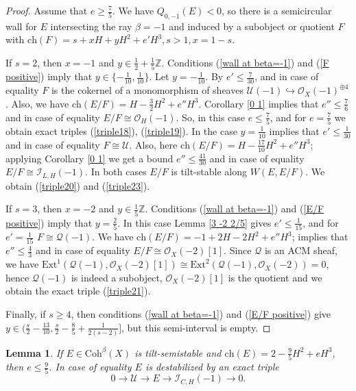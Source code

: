 \documentclass{amsart}
\newtheorem{lemma}[theorem]{Lemma}
\begin{document}
	\begin{proof} Assume that $e\ge\frac 75$. We have $Q_{0,-1}(E)<0$, so there is a semicircular wall for $E$ intersecting the ray $\beta=-1$ and induced by a subobject or quotient $F$ with $\mathrm{ch}(F)=s+xH+yH^2+e'H^3,s>1,x=1-s$.
		
	If $s=2$, then $x=-1$ and $y\in\frac 12+\frac 15\mathbb Z$. Conditions (\ref{wall at beta=-1}) and (\ref{F positive}) imply that $y\in\{-\frac{1}{10},\frac{1}{10}\}$. Let $y=-\frac{1}{10}$. By \cite[Lemma 3.8]{Vass} $e'\le\frac{7}{30}$, and in case of equality $F$ is the cokernel of a monomorphism of sheaves $\mathcal U(-1)\hookrightarrow\mathcal O_X(-1)^{\oplus 4}$. Also, we have $\mathrm{ch}(E/F)=H-\frac 32 H^2+e''H^3$. Corollary \ref{0 1} implies that $e''\le\frac 76$ and in case of equality $E/F\cong\mathcal O_H(-1)$. So, in this case $e\le\frac 75$, and for $e=\frac 75$ we obtain exact triples (\ref{triple18}), (\ref{triple19}). In the case $y=\frac{1}{10}$ \cite[Lemma 3.6]{Vass} implies that $e'\le\frac{1}{30}$ and in case of equality $F\cong \mathcal U$. Also, here $\mathrm{ch}(E/F)=H-\frac{17}{10} H^2+e''H^3$; applying Corollary \ref{0 1} we get a bound $e''\le\frac{41}{30}$ and in case of equality $E/F\cong\mathcal I_{L,H}(-1)$. In both cases $E/F$ is tilt-stable along $W(E,E/F)$. We obtain (\ref{triple20}) and (\ref{triple23}).
		
	If $s=3$, then $x=-2$ and $y\in\frac 15\mathbb Z$. Conditions (\ref{wall at beta=-1}) and (\ref{E/F positive}) imply that $y=\frac 25$. In this case Lemma \ref{3 -2 2/5} gives $e'\le\frac{1}{15}$, and for $e'=\frac{1}{15}$ $F\cong\mathcal Q(-1)$. We have $\mathrm{ch}(E/F)=-1+2H-2H^2+e''H^3$; \cite[Corollary 3.3]{Vass} implies that $e''\le\frac 43$ and in case of equality $E/F\cong\mathcal O_X(-2)[1]$. Since $\mathcal Q$ is an ACM sheaf, we have $\mathrm{Ext}^1(\mathcal Q(-1),\mathcal O_X(-2)[1])\cong\mathrm{Ext}^2(\mathcal Q(-1),\mathcal O_X(-2))=0$, hence $\mathcal Q(-1)$ is indeed a subobject, $\mathcal O_X(-2)[1]$ is the quotient and we obtain the exact triple (\ref{triple21}).
		
	Finally, if $s\ge 4$, then conditions (\ref{wall at beta=-1}) and (\ref{E/F positive}) give $y\in(\frac s2-\frac{13}{10},\frac s2-\frac 85+\frac{1}{2(s-2)}]$, but this semi-interval is empty.
	\end{proof}
	
	\begin{lemma}\label{2 0 -9/5} If $E\in\mathrm{Coh}^\beta(X)$ is tilt-semistable and $\mathrm{ch}(E)=2-\frac 95 H^2+eH^3$, then $e\le\frac 95$. In case of equality $E$ is destabilized by an exact triple
		\begin{equation}\label{triple22}0\to\mathcal U\to E\to \mathcal I_{C,H}(-1)\to 0.\end{equation}
	\end{lemma}
	
\end{document}
